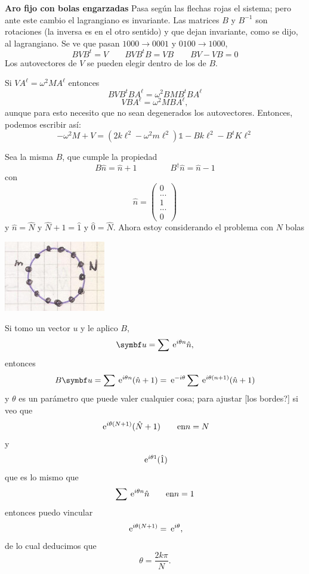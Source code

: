 \documentclass[10pt,oneside]{CBFT_book}
\begin{document}
\begin{ejemplo}{\bf Aro fijo con bolas engarzadas}
Pasa según las flechas rojas el sistema; pero ante este cambio el lagrangiano es invariante.
Las matrices $B$ y $B^{-1}$ son rotaciones (la inversa es en el otro sentido) y que dejan invariante, como se dijo, al lagrangiano.
Se ve que pasan $1000 \to 0001$ y $0100 \to 1000$,
\[
	BVB^t = V \qquad BVB^tB = VB \qquad BV - VB = 0
\]
Los autovectores de $V$ se pueden elegir dentro de los de $B$.

Si $VA^\ell = \omega^2 M A^\ell$ entonces
\[
	BVB^t BA^\ell = \omega^2 BMB^t BA^\ell
\]
\[
	VBA^\ell = \omega^2 MBA^\ell,
\]
aunque para esto necesito que no sean degenerados los autovectores.
Entonces, podemos escribir así:
\[
	- \omega^2 M + V = (2 k \ell^2 - \omega^2 m \ell^2 ) \mathbb{1} - B k \ell^2 - B^t K \ell^2
\]

Sea la misma $B$, que cumple la propiedad
\[
	B\hat{n} = \hat{n}+1 \qquad \qquad B^\dagger\hat{n} = \hat{n}-1
\]
con 
\[
	\hat{n} = \begin{pmatrix}
	           0 \\
	           ...\\
	           1\\
	           ...\\
	           0
	          \end{pmatrix}
\]
y $\hat{n}=\hat{N}$ y $\hat{N}+1=\hat{1}$ y $\hat{0}=\hat{N}$.
Ahora estoy considerando el problema con $N$ bolas

\includegraphics[scale=0.5]{images/fig_mc_problema_aro_modos_normales_10.jpg} 


Si tomo un vector $u$ y le aplico $B$,
\[
	\vb{u} = \sum \euler^{i\theta n} \hat{n},
\]
entonces
\[
	B \vb{u} = \sum \euler^{i\theta n} (\hat{n} + 1) = \euler^{-i \theta } \sum \euler^{i\theta (n+1)} (\hat{n} + 1)
\]
y $\theta$ es un parámetro que puede valer cualquier cosa; para ajustar [los bordes?] si veo que 
\[
	\:\mathrm{e}^{i\theta (N+1)} (\hat{N} + 1) \qquad \text{en} n=N
\]
y
\[
	\:\mathrm{e}^{i\theta 1} (\hat{1}) 
\]
que es lo mismo que 
\[
	\sum \:\mathrm{e}^{i\theta n} \hat{n} \qquad \text{en} n=1
\]
entonces puedo vincular
\[
	\:\mathrm{e}^{i\theta (N+1)} = \:\mathrm{e}^{i\theta },
\]
de lo cual deducimos que
\[
	\theta = \frac{2k\pi}{N}.
\]


\end{ejemplo}
\end{document}
